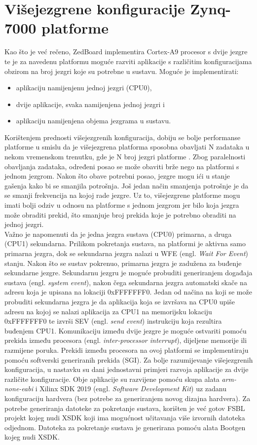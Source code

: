 \documentclass[times, utf8, diplomski, numeric]{fer}
\begin{document}
\chapter{Višejezgrene konfiguracije Zynq-7000 platforme}
Kao što je već rečeno, ZedBoard implementira Cortex-A9 procesor s dvije jezgre te je za navedenu
platformu moguće razviti aplikacije s različitim konfiguracijama obzirom na broj jezgri koje su potrebne
u sustavu. Moguće je implementirati:
\begin{itemize}
  \item{aplikaciju namijenjenu jednoj jezgri (CPU0),}
  \item{dvije aplikacije, svaka namijenjena jednoj jezgri i}
  \item{aplikaciju namijenjena objema jezgrama u sustavu.}
\end{itemize}
Korištenjem prednosti višejezgrenih konfiguracija, dobiju se bolje performanse platforme u smislu da je višejezgrena platforma
sposobna obavljati N zadataka u nekom vremenskom trenutku, gde je N broj jezgri platforme \cite{cortexa_pg}. Zbog paralelnosti
obavljanja zadataka, određeni posao se može obaviti brže nego na platformi s jednom jezgrom. Nakon što obave potrebni posao,
jezgre mogu ići u stanje gašenja kako bi se smanjila potrošnja. Još jedan način smanjenja potrošnje je da se smanji frekvencija
na kojoj rade jezgre. Uz to, višejezgrene platforme mogu imati bolji odziv u odnosu na platforme s jednom jezgrom jer bilo koja
jezgra može obraditi prekid, što smanjuje broj prekida koje je potrebno obraditi na jednoj jezgri.\\
Važno je napomenuti da je jedna jezgra sustava (CPU0) primarna, a druga (CPU1) sekundarna. Prilikom
pokretanja sustava, na platformi je aktivna samo primarna jezgra, dok se sekundarna jezgra nalazi u
WFE (engl. \textit{Wait For Event}) stanju. Nakon što se sustav pokrenuo, primarna jezgra je zadužena
za buđenje sekundarne jezgre. Sekundarnu jezgru je moguće probuditi generiranjem događaja sustava
(engl. \textit{system event}), nakon čega sekundarna jezgra automatski skače na adresu koja je upisana
na lokaciji 0xFFFFFFF0. Jedan od načina na koji se može probuditi sekundarna jezgra je da aplikacija
koja se izvršava na CPU0 upiše adresu na kojoj se nalazi aplikacija za CPU1 na memorijsku lokaciju
0xFFFFFFF0 te izvrši SEV (engl. \textit{send event}) instrukciju koja rezultira buđenjem CPU1.
Komunikaciju između dvije jezgre je moguće ostvariti pomoću prekida između procesora
(engl. \textit{inter-processor interrupt}), dijeljene memorije ili razmijene poruka. Prekidi između procesora
na ovoj platformi se implementiraju pomoću softverski generiranih prekida (SGI). Za bolje razumijevanje
višejezgrenih konfiguracija, u nastavku su dani jednostavni primjeri razvoja aplikacije za dvije različite
konfiguracije. Obje aplikacije su razvijene pomoću skupa alata \textit{arm-none-eabi} i Xilinx SDK 2019 (engl.
\textit{Software Development Kit}) uz zadanu konfiguraciju hardvera (bez potrebe za generiranjem
novog dizajna hardvera). Za potrebe generiranja datoteke za pokretanje sustava, korišten je već gotov FSBL projekt
kojeg nudi XSDK koji ima mogućnost učitavanja više izvornih datoteka odjednom. Datoteka za pokretanje sustava je
generirana pomoću alata Bootgen kojeg nudi XSDK.
\end{document}
